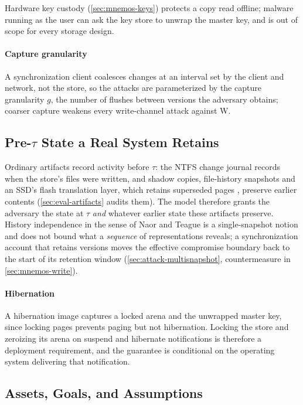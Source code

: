 Hardware key custody (\cref{sec:mnemos-keys}) protects a copy read offline; malware running as the
user can ask the key store to unwrap the master key, and is out of scope for every storage design.

\paragraph{Capture granularity}
\label{sec:granularity}
A synchronization client coalesces changes at an interval set by the client and network, not the
store, so the attacks are parameterized by the capture granularity $g$, the number of flushes between
versions the adversary obtains; coarser capture weakens every write-channel attack against W.

\subsection{Pre-\texorpdfstring{$\tau$}{tau} State a Real System Retains}
\label{sec:artifacts}

Ordinary artifacts record activity before $\tau$: the NTFS change journal records when the
store's files were written, and shadow copies, file-history snapshots and an SSD's flash
translation layer, which retains superseded pages \cite{wei2011reliably}, preserve earlier
contents (\cref{sec:eval-artifacts} audits them). The model therefore grants the adversary the
state at $\tau$ \emph{and} whatever earlier state these artifacts preserve. History independence in
the sense of Naor and Teague \cite{naor2001anti} is a single-snapshot notion and does not bound what
a \emph{sequence} of representations reveals; a synchronization account that retains versions
moves the effective compromise boundary back to the start of its retention window
(\cref{sec:attack-multisnapshot}, countermeasure in \cref{sec:mnemos-write}).

\paragraph{Hibernation}
A hibernation image captures a locked arena and the unwrapped master key, since locking pages
prevents paging but not hibernation. Locking the store and zeroizing its arena on suspend and
hibernate notifications is therefore a deployment requirement, and the guarantee is conditional on
the operating system delivering that notification.

\subsection{Assets, Goals, and Assumptions}

